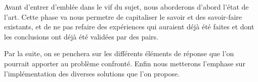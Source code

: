 Avant d'entrer d'emblée dans le vif du sujet, nous aborderons 
d'abord l'état de l'art. Cette phase va nous permetre de capitaliser le 
savoir et des savoir-faire existants, et de ne pas refaire des expériences 
qui auraient déjà été faites et dont les conclusions ont déjà été validées 
par des pairs.
\par
Par la suite, on se penchera sur les différents éléments de réponse que l'on 
pourrait apporter au problème confronté.
Enfin nous metterons l'emphase sur l'implémentation des diverses solutions 
que l'on propose.
